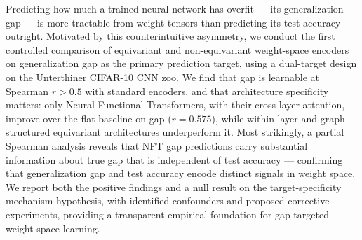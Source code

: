 Predicting how much a trained neural network has overfit --- its generalization gap --- is more tractable
from weight tensors than predicting its test accuracy outright. Motivated by this counterintuitive
asymmetry, we conduct the first controlled comparison of equivariant and non-equivariant weight-space
encoders on generalization gap as the primary prediction target, using a dual-target design on the
Unterthiner CIFAR-10 CNN zoo. We find that gap is learnable at Spearman $r > 0.5$ with standard encoders,
and that architecture specificity matters: only Neural Functional Transformers, with their cross-layer
attention, improve over the flat baseline on gap ($r = 0.575$), while within-layer and graph-structured
equivariant architectures underperform it. Most strikingly, a partial Spearman analysis reveals that
NFT gap predictions carry substantial information about true gap that is independent of test accuracy ---
confirming that generalization gap and test accuracy encode distinct signals in weight space. We report
both the positive findings and a null result on the target-specificity mechanism hypothesis, with
identified confounders and proposed corrective experiments, providing a transparent empirical foundation
for gap-targeted weight-space learning.
